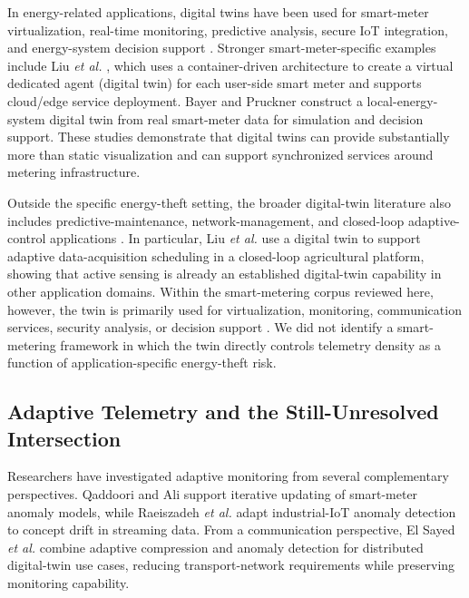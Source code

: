 \documentclass{ieeeaccess}
\begin{document}
In energy-related applications, digital twins have been used for smart-meter virtualization, real-time monitoring, predictive analysis, secure IoT integration, and energy-system decision support \cite{b18,b19,b20,b21,b22}. Stronger smart-meter-specific examples include Liu \textit{et al.} \cite{b39}, which uses a container-driven architecture to create a virtual dedicated agent (digital twin) for each user-side smart meter and supports cloud/edge service deployment. Bayer and Pruckner \cite{b40} construct a local-energy-system digital twin from real smart-meter data for simulation and decision support. These studies demonstrate that digital twins can provide substantially more than static visualization and can support synchronized services around metering infrastructure.

Outside the specific energy-theft setting, the broader digital-twin literature also includes predictive-maintenance, network-management, and closed-loop adaptive-control applications \cite{b23,b24,b25}. In particular, Liu \textit{et al.} \cite{b25} use a digital twin to support adaptive data-acquisition scheduling in a closed-loop agricultural platform, showing that active sensing is already an established digital-twin capability in other application domains. Within the smart-metering corpus reviewed here, however, the twin is primarily used for virtualization, monitoring, communication services, security analysis, or decision support \cite{b18,b20,b22,b39,b40}. We did not identify a smart-metering framework in which the twin directly controls telemetry density as a function of application-specific energy-theft risk.

\subsection{Adaptive Telemetry and the Still-Unresolved Intersection}
Researchers have investigated adaptive monitoring from several complementary perspectives. Qaddoori and Ali \cite{b26} support iterative updating of smart-meter anomaly models, while Raeiszadeh \textit{et al.} \cite{b27} adapt industrial-IoT anomaly detection to concept drift in streaming data. From a communication perspective, El Sayed \textit{et al.} \cite{b28} combine adaptive compression and anomaly detection for distributed digital-twin use cases, reducing transport-network requirements while preserving monitoring capability.
\end{document}
